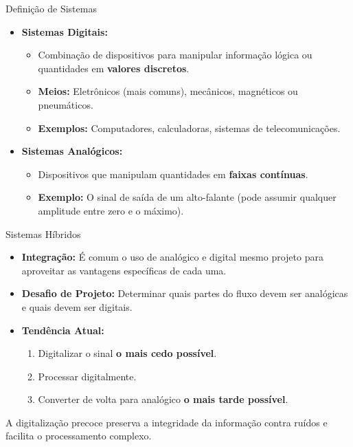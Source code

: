 \begin{frame}{Definição de Sistemas}
    \begin{itemize}
        \item \textbf{Sistemas Digitais:}
              \begin{itemize}
                  \item Combinação de dispositivos para manipular informação lógica ou quantidades em \textbf{valores discretos}.
                  \item \textbf{Meios:} Eletrônicos (mais comuns), mecânicos, magnéticos ou pneumáticos.
                  \item \textbf{Exemplos:} Computadores, calculadoras, sistemas de telecomunicações.
              \end{itemize}
        \item \textbf{Sistemas Analógicos:}
              \begin{itemize}
                  \item Dispositivos que manipulam quantidades em \textbf{faixas contínuas}.
                  \item \textbf{Exemplo:} O sinal de saída de um alto-falante (pode assumir qualquer amplitude entre zero e o máximo).
              \end{itemize}
    \end{itemize}
\end{frame}

\begin{frame}{Sistemas Híbridos}
    \begin{itemize}
        \item \textbf{Integração:} É comum o uso de analógico e digital mesmo projeto para aproveitar as vantagens específicas de cada uma.
        \item \textbf{Desafio de Projeto:} Determinar quais partes do fluxo devem ser analógicas e quais devem ser digitais.
        \item \textbf{Tendência Atual:}
              \begin{enumerate}
                  \item Digitalizar o sinal \textbf{o mais cedo possível}.
                  \item Processar digitalmente.
                  \item Converter de volta para analógico \textbf{o mais tarde possível}.
              \end{enumerate}
    \end{itemize}




    A digitalização precoce preserva a integridade da informação contra ruídos e facilita o processamento complexo.

\end{frame}



